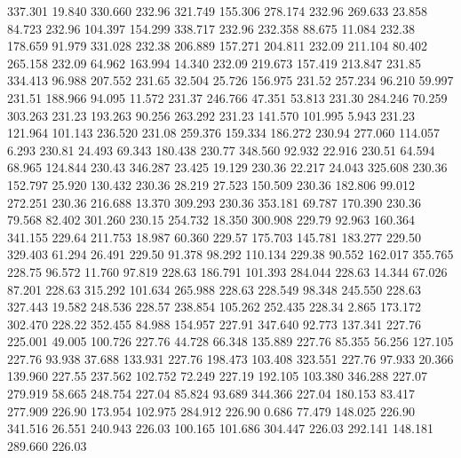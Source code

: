  337.301   19.840  330.660       232.96
 321.749  155.306  278.174       232.96
 269.633   23.858   84.723       232.96
 104.397  154.299  338.717       232.96
 232.358   88.675   11.084       232.38
 178.659   91.979  331.028       232.38
 206.889  157.271  204.811       232.09
 211.104   80.402  265.158       232.09
  64.962  163.994   14.340       232.09
 219.673  157.419  213.847       231.85
 334.413   96.988  207.552       231.65
  32.504   25.726  156.975       231.52
 257.234   96.210   59.997       231.51
 188.966   94.095   11.572       231.37
 246.766   47.351   53.813       231.30
 284.246   70.259  303.263       231.23
 193.263   90.256  263.292       231.23
 141.570  101.995    5.943       231.23
 121.964  101.143  236.520       231.08
 259.376  159.334  186.272       230.94
 277.060  114.057    6.293       230.81
  24.493   69.343  180.438       230.77
 348.560   92.932   22.916       230.51
  64.594   68.965  124.844       230.43
 346.287   23.425   19.129       230.36
  22.217   24.043  325.608       230.36
 152.797   25.920  130.432       230.36
  28.219   27.523  150.509       230.36
 182.806   99.012  272.251       230.36
 216.688   13.370  309.293       230.36
 353.181   69.787  170.390       230.36
  79.568   82.402  301.260       230.15
 254.732   18.350  300.908       229.79
  92.963  160.364  341.155       229.64
 211.753   18.987   60.360       229.57
 175.703  145.781  183.277       229.50
 329.403   61.294   26.491       229.50
  91.378   98.292  110.134       229.38
  90.552  162.017  355.765       228.75
  96.572   11.760   97.819       228.63
 186.791  101.393  284.044       228.63
  14.344   67.026   87.201       228.63
 315.292  101.634  265.988       228.63
 228.549   98.348  245.550       228.63
 327.443   19.582  248.536       228.57
 238.854  105.262  252.435       228.34
   2.865  173.172  302.470       228.22
 352.455   84.988  154.957       227.91
 347.640   92.773  137.341       227.76
 225.001   49.005  100.726       227.76
  44.728   66.348  135.889       227.76
  85.355   56.256  127.105       227.76
  93.938   37.688  133.931       227.76
 198.473  103.408  323.551       227.76
  97.933   20.366  139.960       227.55
 237.562  102.752   72.249       227.19
 192.105  103.380  346.288       227.07
 279.919   58.665  248.754       227.04
  85.824   93.689  344.366       227.04
 180.153   83.417  277.909       226.90
 173.954  102.975  284.912       226.90
   0.686   77.479  148.025       226.90
 341.516   26.551  240.943       226.03
 100.165  101.686  304.447       226.03
 292.141  148.181  289.660       226.03
